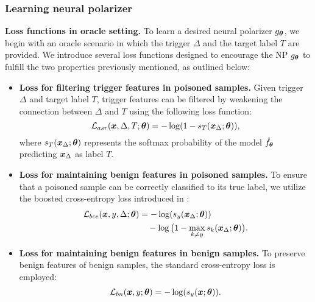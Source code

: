 \subsubsection{Learning neural polarizer\label{sec3.2.2}}
\textbf{Loss functions in oracle setting.}
To learn a desired neural polarizer $g_{\bm{\theta}}$, we begin with an oracle scenario in which the trigger $\Delta$ and the target label $T$ are provided. We introduce several loss functions designed to encourage the NP $g_{\bm{\theta}}$ to fulfill the two properties previously mentioned, as outlined below:
\begin{itemize}[leftmargin=*]
    \item \textbf{Loss for filtering trigger features in poisoned samples.} Given trigger $\Delta$ and target label $T$, trigger features can be filtered  by weakening the connection between \(\Delta\) and \(T\) using the following loss function:
    \begin{equation}
        \mathcal{L}_{asr}(\bm{x},\Delta, T; \bm{\theta}) = -\log(1 - s_{T}(\bm{x}_{\Delta}; \bm{\theta})),
        \label{eq:asr_loss}
    \end{equation}
    where \(s_{T}(\bm{x}_{\Delta}; \bm{\theta})\) represents the softmax probability of the model \(\hat{f}_{\bm{\theta}}\) predicting \(\bm{x}_{\Delta}\) as label \(T\).
    \item \textbf{Loss for maintaining benign features in poisoned samples.} To ensure that a poisoned sample can be correctly classified to its true label, we utilize the boosted cross-entropy loss introduced in \cite{wang2020improving}:
    \begin{equation}
    \begin{aligned}
        \mathcal{L}_{bce}(\bm{x}, y, \Delta; \bm{\theta}) &= -\log(s_{y}(\bm{x}_{\Delta}; \bm{\theta})) \\
        &\quad - \log\big(1 - \max_{k \neq y} s_{k}(\bm{x}_{\Delta}; \bm{\theta})\big).
        \label{eq:bce_loss}
    \end{aligned}
    \end{equation}
    \item \textbf{Loss for maintaining benign features in benign samples.} To preserve benign features of benign samples, the standard cross-entropy loss is employed:
    \begin{equation}
        \mathcal{L}_{bn}(\bm{x}, y; \bm{\theta}) = -\log(s_{y}(\bm{x}; \bm{\theta})).
    \end{equation}
\end{itemize}
